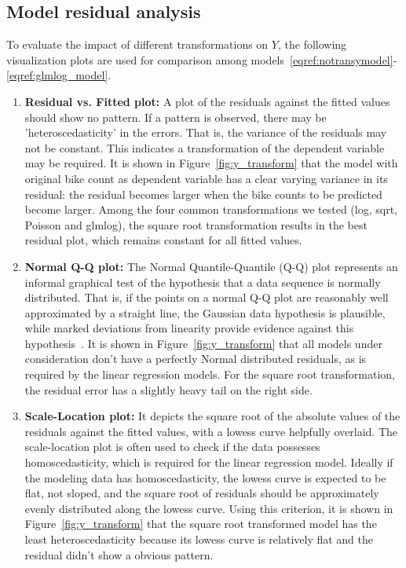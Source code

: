 \documentclass [11pt, proquest] {uwthesis}[2015/03/03]
\begin{document}
\subsection{Model residual analysis}

To evaluate the impact of different transformations on $Y$, the following visualization plots are used for comparison among models~\eqref{eqref:notransymodel}-\eqref{eqref:glmlog_model}.
\begin{enumerate}
\item \textbf{Residual vs. Fitted plot:} A plot of the residuals against the fitted values should show no pattern. If a pattern is observed, there may be 'heteroscedasticity' in the errors. That is, the variance of the residuals may not be constant. This indicates a transformation of the dependent variable may be required. It is shown in Figure~\ref{fig:y_transform} that the model with original bike count as dependent variable has a clear varying variance in its residual: the residual becomes larger when the bike counts to be predicted become larger. Among the four common transformations we tested (log, sqrt, Poisson and glmlog), the square root transformation results in the best residual plot, which remains constant for all fitted values. 
\item \textbf{Normal Q-Q plot:} The Normal Quantile-Quantile (Q-Q) plot represents an informal graphical test of the hypothesis that a data sequence is normally distributed. That is, if the points on a normal Q-Q plot are reasonably well approximated by a straight line, the Gaussian data hypothesis is plausible, while marked deviations from linearity provide evidence against this hypothesis~\cite{Pearson2011}. It is shown in Figure~\ref{fig:y_transform} that all models under consideration don't have a perfectly Normal distributed residuals, as is required by the linear regression models. For the square root transformation, the residual error has a slightly heavy tail on the right side. 
\item \textbf{Scale-Location plot:} It depicts the square root of the absolute values of the residuals against the fitted values, with a lowess curve helpfully overlaid. The scale-location plot is often used to check if the data possesses homoscedasticity, which is required for the linear regression model. Ideally if the modeling data has homoscedasticity, the lowess curve is expected to be flat, not sloped, and the square root of residuals should be approximately evenly distributed along the lowess curve. Using this criterion, it is shown in Figure~\ref{fig:y_transform} that the square root transformed model has the least heteroscedasticity because its lowess curve is relatively flat and the residual didn't show a obvious pattern.

\end{enumerate}
\end{document}
